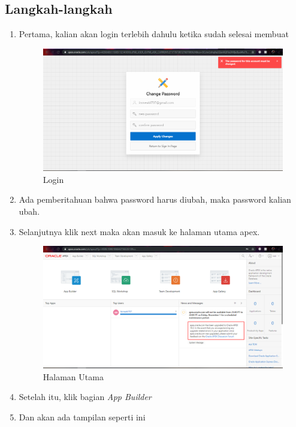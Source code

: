 \documentclass{article}
\begin{document}
    \subsection{Langkah-langkah}
    \begin{enumerate}
        \item Pertama, kalian akan login terlebih dahulu ketika sudah selesai membuat 
    \begin{figure}[!htbp]
        \centering
        \includegraphics[scale=0.3]{figure/8.PNG}
        \caption{Login}
    \end{figure}
    \item Ada pemberitahuan bahwa password harus diubah, maka password kalian ubah.
\newpage
    \item Selanjutnya klik next maka akan masuk ke halaman utama apex.
    \begin{figure}[!htbp]
        \centering
        \includegraphics[scale=0.3]{figure/9.PNG}
        \caption{Halaman Utama}
    \end{figure}
    \item Setelah itu, klik bagian \textit{App Builder}
    \item Dan akan ada tampilan seperti ini
    \begin{figure}[!htbp]

\end{figure}
\end{enumerate}
\end{document}

